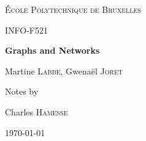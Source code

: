 \documentclass[11pt]{book}
\begin{document}
\begin{titlepage}
	\centering
	\vspace{1cm}
	{\scshape\LARGE École Polytechnique de Bruxelles \par}
	\vspace{3.5cm}
	{\scshape\Large INFO-F521\par}
	\vspace{.5cm}
	{\huge\bfseries Graphs and Networks\par}
	\vspace{2cm}
	{\Large Martine \textsc{Labbe}, Gwenaël \textsc{Joret}\par}
	\vfill
	Notes by \par
	Charles \textsc{Hamesse}

	\vfill

	{\large \today\par}
\end{titlepage}
\tableofcontents







\end{document}

